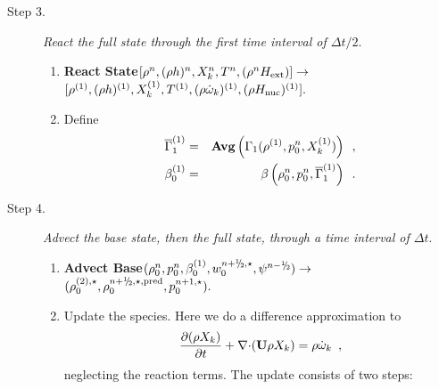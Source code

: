 \documentclass[11pt]{article}
\newcommand{\rhozero}{\rho_0}
\newcommand{\gammabar}{\overline{\Gamma}_1}
\newcommand{\nablab}{\mathbf{\nabla}}
\newcommand{\cdotb}{\mathbf{\cdot}}
\newcommand{\sfrac}[2]{\mathchoice
  {\kern0em\raise.5ex\hbox{\the\scriptfont0 #1}\kern-.15em/
   \kern-.15em\lower.25ex\hbox{\the\scriptfont0 #2}}
  {\kern0em\raise.5ex\hbox{\the\scriptfont0 #1}\kern-.15em/
   \kern-.15em\lower.25ex\hbox{\the\scriptfont0 #2}}
  {\kern0em\raise.5ex\hbox{\the\scriptscriptfont0 #1}\kern-.2em/
   \kern-.15em\lower.25ex\hbox{\the\scriptscriptfont0 #2}}
  {#1\!/#2}}
\newcommand{\myhalf}{\sfrac{1}{2}}
\newcommand{\nph}{{n + \myhalf}}
\newcommand{\nmh}{{n - \myhalf}}
\newcommand{\Hext}{{H_{\rm ext}}}
\newcommand{\Hnuc}{{H_{\rm nuc}}}
\newcommand{\dt}{\Delta t}
\newcommand{\ubold}{\mathbf{U}}
\newcommand{\omegadot}{\dot{\omega}}
\begin{document}
\begin{description}
\item[Step 3.] {\em React the full state through the first time interval of $\dt / 2.$}

\begin{enumerate}
\renewcommand{\theenumi}{{\bf \alph{enumi}}}

\item {\bf React State}$[\rho^n, (\rho h)^n, X_k^n, T^n, (\rho^n \Hext)]
                   \rightarrow$ $[ \rho^{(1)}, (\rho h)^{(1)}, X_k^{(1)}, T^{(1)},
                                  (\rho \omegadot_k)^{(1)}, (\rho \Hnuc)^{(1)} ].$  

\item
Define
\begin{eqnarray}
\gammabar^{(1)}        &=& {\rm{\bf Avg}} \left( \Gamma_1(\rho^{(1)}, p_0^{n}, X_k^{(1)}) \right) 
                                                                \enskip , \nonumber \\
 {\beta   }_0^{(1)}    &=& \beta   \left(\rho_0^{n}, p_0^{n}, \gammabar^{(1)}\right) \enskip .
\end{eqnarray}

\end{enumerate}

\item[Step 4.] {\em Advect the base state, then the full state, through a time interval of $\dt.$}

\begin{enumerate}
\renewcommand{\theenumi}{{\bf \alph{enumi}}}

\item {\bf Advect Base}$(\rhozero^{n}, p_0^{n}, \beta_0^{(1)}, w_0^{\nph,\star}, \psi^{\nmh}) \rightarrow $
$(\rho_0^{(2),\star}, \rho_0^{\nph,\star,{\rm pred}}, p_0^{n+1,\star}).$ 

\item Update the species.  Here we do a difference approximation
  to 
  \begin{equation}
  \frac{\partial (\rho X_k)}{\partial t} + \nablab \cdotb (\ubold \rho X_k) =
         \rho {\omegadot}_k \enskip , \label{eq:species}
  \end{equation}
  neglecting the reaction terms.  The update consists of two steps:


\end{enumerate}
\end{description}
\end{document}
